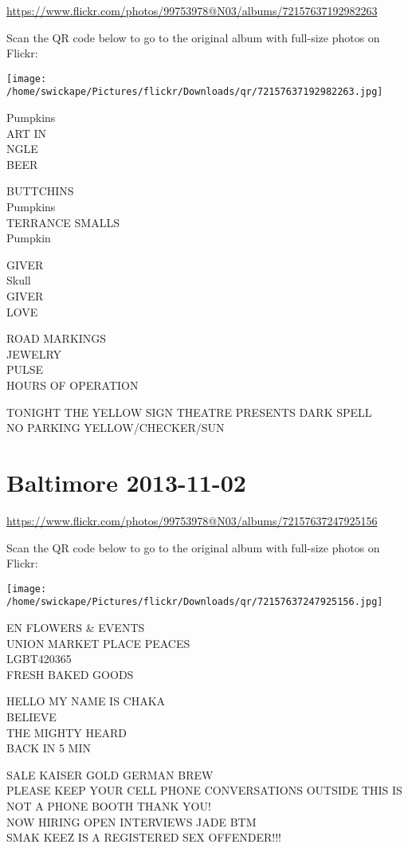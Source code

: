 \documentclass[10pt,letterpaper]{article}
\begin{document}
\url{https://www.flickr.com/photos/99753978@N03/albums/72157637192982263}

Scan the QR code below to go to the original album with full-size photos on Flickr:

\texttt{[image: /home/swickape/Pictures/flickr/Downloads/qr/72157637192982263.jpg]}


Pumpkins\\
ART IN\\
NGLE\\
BEER

BUTTCHINS\\
Pumpkins\\
TERRANCE SMALLS\\
Pumpkin

GIVER\\
Skull\\
GIVER\\
LOVE

ROAD MARKINGS\\
JEWELRY\\
PULSE\\
HOURS OF OPERATION

TONIGHT THE YELLOW SIGN THEATRE PRESENTS DARK SPELL\\
NO PARKING YELLOW/CHECKER/SUN


\section*{Baltimore 2013-11-02}

\url{https://www.flickr.com/photos/99753978@N03/albums/72157637247925156}

Scan the QR code below to go to the original album with full-size photos on Flickr:

\texttt{[image: /home/swickape/Pictures/flickr/Downloads/qr/72157637247925156.jpg]}


EN FLOWERS \& EVENTS\\
UNION MARKET PLACE PEACES\\
LGBT420365\\
FRESH BAKED GOODS

HELLO MY NAME IS CHAKA\\
BELIEVE\\
THE MIGHTY HEARD\\
BACK IN 5 MIN

SALE KAISER GOLD GERMAN BREW\\
PLEASE KEEP YOUR CELL PHONE CONVERSATIONS OUTSIDE THIS IS NOT A PHONE BOOTH THANK YOU!\\
NOW HIRING OPEN INTERVIEWS JADE BTM\\
SMAK KEEZ IS A REGISTERED SEX OFFENDER!!!
\end{document}
